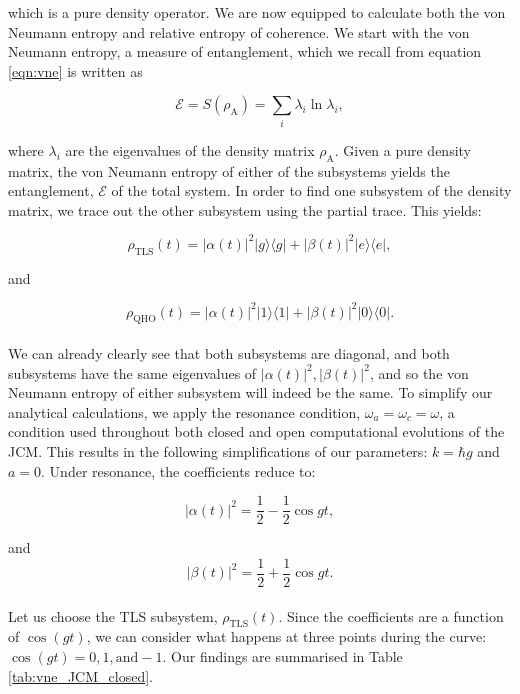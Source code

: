 \documentclass[11pt]{article}
\begin{document}
which is a pure density operator. We are now equipped to calculate both the von Neumann entropy and relative entropy of coherence. We start with the von Neumann entropy, a measure of entanglement, which we recall from equation \eqref{eqn:vne} is written as 

\begin{equation*}
   \mathcal{E} = S(\rho_{\scriptscriptstyle \text{A}}) = \sum_i \lambda_i\ln\lambda_i,
\end{equation*}

where $\lambda_i$ are the eigenvalues of the density matrix $\rho_{\scriptscriptstyle \text{A}}$. Given a pure density matrix, the von Neumann entropy of either of the subsystems yields the entanglement, $\mathcal{E}$ of the total system. In order to find one subsystem of the density matrix, we trace out the other subsystem using the partial trace. This yields:

\begin{equation*}
        \rho_{\scriptscriptstyle \text{TLS}}(t) = |\alpha(t)|^2|g\rangle\langle g| + |\beta(t)|^2 |e\rangle\langle e|,
\end{equation*}

and

\begin{equation} \label{eqn:subsys_JCM_closed}
        \rho_{\scriptscriptstyle \text{QHO}}(t) = |\alpha(t)|^2|1\rangle\langle 1| + |\beta(t)|^2 |0\rangle\langle 0|.
\end{equation}
\\
We can already clearly see that both subsystems are diagonal, and both subsystems have the same eigenvalues of $|\alpha(t)|^2,|\beta(t)|^2$, and so the von Neumann entropy of either subsystem will indeed be the same. To simplify our analytical calculations, we apply the resonance condition, $\omega_a = \omega_c = \omega$, a condition used throughout both closed and open computational evolutions of the JCM. This results in the following simplifications of our parameters: $k = \hbar g$ and $a = 0$. Under resonance, the coefficients reduce to:

\begin{equation*}
    |\alpha(t)|^2 = \frac{1}{2} - \frac{1}{2}\cos gt,
\end{equation*}

and 
\begin{equation} \label{eqn:JCM_complex_coeffs}
    |\beta(t)|^2 = \frac{1}{2} + \frac{1}{2}\cos gt.
\end{equation}
\\
Let us choose the TLS subsystem, $\rho_{\scriptscriptstyle \text{TLS}}(t)$. Since the coefficients are a function of $\cos(gt)$, we can consider what happens at three points during the curve: $\cos(gt) = 0,1, \text{and} -1$. Our findings are summarised in Table \ref{tab:vne_JCM_closed}.
\end{document}
